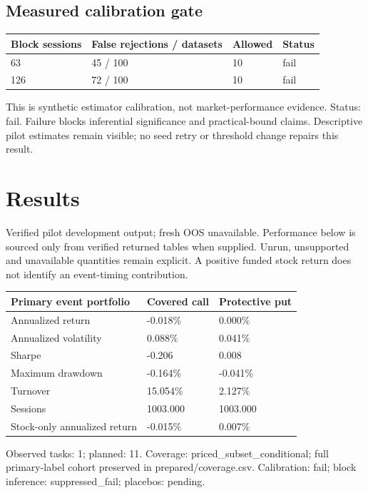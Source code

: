\documentclass[11pt,letterpaper]{article}
\begin{document}
\subsection*{Measured calibration gate}
\begin{tabular}{@{}p{}p{}p{}p{}@{}}
\toprule
\textbf{Block sessions} & \textbf{False rejections / datasets} & \textbf{Allowed} & \textbf{Status} \\
\midrule
63 & 45 / 100 & 10 & fail \\
126 & 72 / 100 & 10 & fail \\
\bottomrule
\end{tabular}
\par\smallskip
This is synthetic estimator calibration, not market-performance evidence. Status: fail. Failure blocks inferential significance and practical-bound claims. Descriptive pilot estimates remain visible; no seed retry or threshold change repairs this result.


\clearpage
\section{Results}
Verified pilot development output; fresh OOS unavailable. Performance below is sourced only from verified returned tables when supplied. Unrun, unsupported and unavailable quantities remain explicit. A positive funded stock return does not identify an event-timing contribution.

\begin{tabular}{@{}p{}p{}p{}@{}}
\toprule
\textbf{Primary event portfolio} & \textbf{Covered call} & \textbf{Protective put} \\
\midrule
Annualized return & -0.018\% & 0.000\% \\
Annualized volatility & 0.088\% & 0.041\% \\
Sharpe & -0.206 & 0.008 \\
Maximum drawdown & -0.164\% & -0.041\% \\
Turnover & 15.054\% & 2.127\% \\
Sessions & 1003.000 & 1003.000 \\
Stock-only annualized return & -0.015\% & 0.007\% \\
\bottomrule
\end{tabular}
\par\smallskip
Observed tasks: 1; planned: 11. Coverage: priced\_subset\_conditional; full primary-label cohort preserved in prepared/coverage.csv. Calibration: fail; block inference: suppressed\_fail; placebos: pending.
\end{document}
